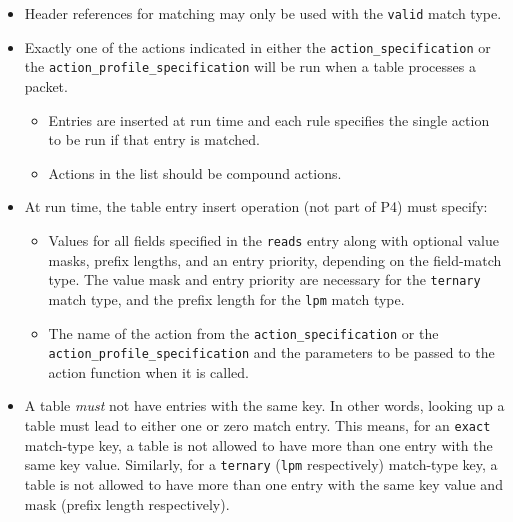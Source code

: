 \documentclass[12pt]{article}
\begin{document}
\begin{itemize}
\item
Header references for matching may only be used with the \texttt{valid} match type.
\item
Exactly one of the actions indicated in either the
\texttt{action_specification} or the \texttt{action_profile_specification}
will be run when a table processes a packet.

\begin{itemize}
\item
Entries are inserted at run time and each rule specifies the single action 
to be run if that entry is matched.
\item
Actions in the list should be compound actions.
\end{itemize}

\item
At run time, the table entry insert operation (not part of P4) must specify:

\begin{itemize}
\item
Values for all fields specified in the \texttt{reads} entry along with optional 
value masks, prefix lengths, and an entry priority, depending on the field-match type.
The value mask and entry priority are necessary for the \texttt{ternary} match type, and 
the prefix length for the \texttt{lpm} match type.
\item
The name of the action from the \texttt{action_specification} or the
\texttt{action_profile_specification} and the parameters to be passed to the
action function when it is called.
\end{itemize}

\item
A table \textit{must} not have entries with the same key. In other words, looking up a table
must lead to either one or zero match entry. This means, for an \texttt{exact} 
match-type key, a table is not allowed to have more than one entry with the same key value.
Similarly, for a \texttt{ternary} (\texttt{lpm} respectively) match-type key, a table is 
not allowed to have more than one entry with the same key value and mask (prefix length respectively).


\end{itemize}
\end{document}
